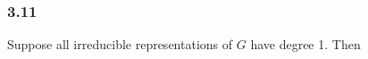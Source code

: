 \documentclass[]{article}
\begin{document}
%

\subsubsection*{3.11}
Suppose all irreducible representations of $G$ have degree 1. Then 
\end{document}
